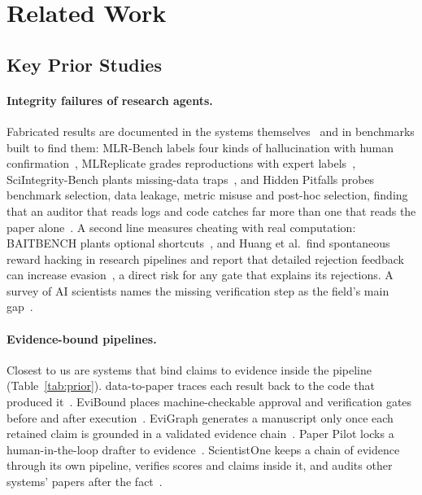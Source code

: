 \documentclass[sigconf,anonymous]{aamas}
\begin{document}
\section{Related Work}
\label{sec:related}

\subsection{Key Prior Studies}

\paragraph{Integrity failures of research agents.}
Fabricated results are documented in the systems themselves~\cite{lu2024aiscientist,beel2025evaluating,miyai2025jraiscientist} and in benchmarks built to find them: MLR-Bench labels four kinds of hallucination with human confirmation~\cite{chen2025mlrbench}, MLReplicate grades reproductions with expert labels~\cite{gaddipati2026mlreplicate}, SciIntegrity-Bench plants missing-data traps~\cite{yang2026sciintegrity}, and Hidden Pitfalls probes benchmark selection, data leakage, metric misuse and post-hoc selection, finding that an auditor that reads logs and code catches far more than one that reads the paper alone~\cite{luo2025hiddenpitfalls}.
A second line measures cheating with real computation: BAITBENCH plants optional shortcuts~\cite{shyamaprasad2026baitbench}, and Huang et al.\ find spontaneous reward hacking in research pipelines and report that detailed rejection feedback can increase evasion~\cite{huang2026rewardhacking}, a direct risk for any gate that explains its rejections.
A survey of AI scientists names the missing verification step as the field's main gap~\cite{ding2026verificationgap}.

\paragraph{Evidence-bound pipelines.}
Closest to us are systems that bind claims to evidence inside the pipeline (Table~\ref{tab:prior}).
data-to-paper traces each result back to the code that produced it~\cite{ifargan2024datatopaper}.
EviBound places machine-checkable approval and verification gates before and after execution~\cite{chen2025evibound}.
EviGraph generates a manuscript only once each retained claim is grounded in a validated evidence chain~\cite{ren2026evigraph}.
Paper Pilot locks a human-in-the-loop drafter to evidence~\cite{jha2026paperpilot}.
ScientistOne keeps a chain of evidence through its own pipeline, verifies scores and claims inside it, and audits other systems' papers after the fact~\cite{meng2026scientistone}.
\end{document}
